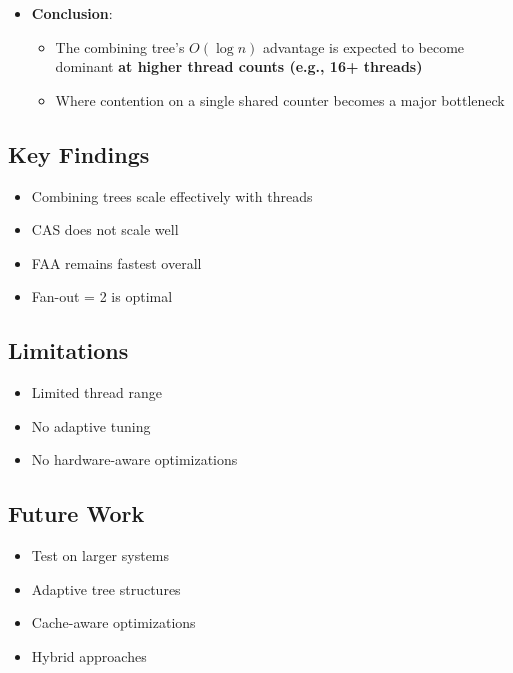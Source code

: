 \documentclass[11pt,a4paper]{article}
\begin{document}
\begin{itemize}
\begin{itemize}
        \item Fan-out = 4
        \begin{itemize}
            \item Higher contention per node
            \item Delays or prevents crossover
        \end{itemize}
    \end{itemize}

    \item \textbf{Conclusion}:
    \begin{itemize}
        \item The combining tree’s $O(\log n)$ advantage is expected to become dominant \textbf{at higher thread counts (e.g., 16+ threads)}
        \item Where contention on a single shared counter becomes a major bottleneck
    \end{itemize}
\end{itemize}

\subsection*{Key Findings}

\begin{itemize}
    \item Combining trees scale effectively with threads
    \item CAS does not scale well
    \item FAA remains fastest overall
    \item Fan-out = 2 is optimal
\end{itemize}

\subsection*{Limitations}

\begin{itemize}
    \item Limited thread range
    \item No adaptive tuning
    \item No hardware-aware optimizations
\end{itemize}

\subsection*{Future Work}

\begin{itemize}
    \item Test on larger systems
    \item Adaptive tree structures
    \item Cache-aware optimizations
    \item Hybrid approaches
\end{itemize}
\end{document}
